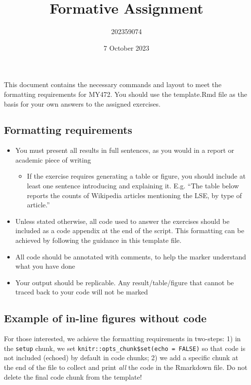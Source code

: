 \documentclass[
]{article}
\title{Formative Assignment}
\author{202359074}
\date{7 October 2023}
\providecommand{\tightlist}{%
  \setlength{\itemsep}{0pt}\setlength{\parskip}{0pt}}
\begin{document}
\maketitle

This document contains the necessary commands and layout to meet the
formatting requirements for MY472. You should use the template.Rmd file
as the basis for your own answers to the assigned exercises.

\hypertarget{formatting-requirements}{%
\subsection{Formatting requirements}\label{formatting-requirements}}

\begin{itemize}
\item
  You must present all results in full sentences, as you would in a
  report or academic piece of writing

  \begin{itemize}
  \tightlist
  \item
    If the exercise requires generating a table or figure, you should
    include at least one sentence introducing and explaining it. E.g.
    ``The table below reports the counts of Wikipedia articles
    mentioning the LSE, by type of article.''
  \end{itemize}
\item
  Unless stated otherwise, all code used to answer the exercises should
  be included as a code appendix at the end of the script. This
  formatting can be achieved by following the guidance in this template
  file.
\item
  All code should be annotated with comments, to help the marker
  understand what you have done
\item
  Your output should be replicable. Any result/table/figure that cannot
  be traced back to your code will not be marked
\end{itemize}

\hypertarget{example-of-in-line-figures-without-code}{%
\subsection{Example of in-line figures without
code}\label{example-of-in-line-figures-without-code}}

For those interested, we achieve the formatting requirements in
two-steps: 1) in the \texttt{setup} chunk, we set
\texttt{knitr::opts\_chunk\$set(echo\ =\ FALSE)} so that code is not
included (echoed) by default in code chunks; 2) we add a specific chunk
at the end of the file to collect and print \emph{all} the code in the
Rmarkdown file. Do not delete the final code chunk from the template!
\end{document}
